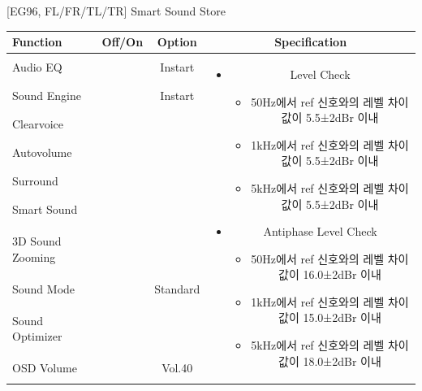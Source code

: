 \documentclass{beamer}
\begin{document}
\begin{frame}[t]{[EG96, FL/FR/TL/TR] Smart Sound Store}
\begin{tiny}
\begin{tabular}{@{}lccc@{}}
\toprule
Function & Off/On & Option & Specification \\
\midrule
Audio EQ & \color{black}{Off} & Instart &
\multirow{10}{60mm}{
\begin{itemize}
\item Level Check
	\begin{itemize}
	\item 50Hz에서 ref 신호와의 레벨 차이값이 5.5±2dBr 이내
	\item 1kHz에서 ref 신호와의 레벨 차이값이 5.5±2dBr 이내
	\item 5kHz에서 ref 신호와의 레벨 차이값이 5.5±2dBr 이내
	\end{itemize}
\item Antiphase Level Check
	\begin{itemize}
	\item 50Hz에서 ref 신호와의 레벨 차이값이 16.0±2dBr 이내
	\item 1kHz에서 ref 신호와의 레벨 차이값이 15.0±2dBr 이내
	\item 5kHz에서 ref 신호와의 레벨 차이값이 18.0±2dBr 이내
	\end{itemize}
\end{itemize}
} \\
Sound Engine & \color{blue}{On} & Instart & \\
Clearvoice & \color{black}{Off} & & \\
Autovolume & \color{black}{Off} & & \\
Surround & \color{black}{Off} & & \\
Smart Sound & \color{blue}{On} & & \\
3D Sound Zooming & \color{black}{Off} & & \\
Sound Mode & \color{blue}{On} & Standard & \\
Sound Optimizer & \color{black}{Off} & & \\
OSD Volume & \color{blue}{On} & Vol.40 & \\
\midrule
\end{tabular}
\end{tiny}

\end{frame}
\end{document}
